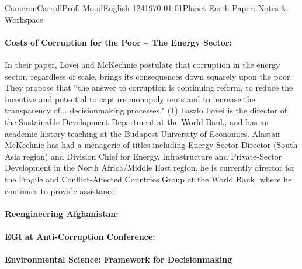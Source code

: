 \documentclass[12pt,letterpaper]{article}
\begin{document}
\begin{mla}{Cameron}{Carroll}{Prof. Mood}{English 124}{\today}{Planet Earth Paper: Notes \& Workspace}
\paragraph{\cite{lovei_alastair_00} Costs of Corruption for the Poor -- The Energy Sector:}
In their paper, Lovei and McKechnie postulate that corruption in the energy sector, regardless of scale, brings its consequences down squarely upon the poor. They propose that ``the answer to corruption is continuing reform, to reduce the incentive and potential to capture monopoly rents and to increase the transparency of... decisionmaking processes." (1) Laszlo Lovei is the director of the Sustainable Development Department at the World Bank, and has an academic history teaching at the Budapest University of Economics. Alastair McKechnie has had a menagerie of titles including Energy Sector Director (South Asia region) and Division Chief for Energy, Infrastructure and Private-Sector Development in the North Africa/Middle East region. he is currently director for the Fragile and Conflict-Affected Countries Group at the World Bank, where he continues to provide assistance.

\paragraph{\cite{ieeespec_zorpette_11} Reengineering Afghanistan:}

\paragraph{\cite{egi_wood_10} EGI at Anti-Corruption Conference:}

\paragraph{Environmental Science: Framework for Decisionmaking}




\end{mla}
\end{document}
